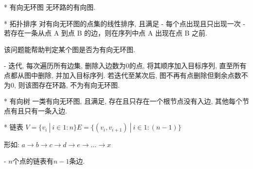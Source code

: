 * 有向无环图
	\Define
		无环路的有向图.

	\Property
		* 拓扑排序
			\Problem
				对有向无环图的点集的线性排序, 且满足
				- 每个点出现且只出现一次
				- 若存在一条从点 A 到点 B 的边，则在序列中点 A 出现在点 B 之前.

				\Note
					该问题能帮助判定某个图是否为有向无环图.

			\Algorithm
				- 迭代, 每次遍历所有边集, 删除入边数为0的点, 将其顺序加入目标序列, 直至所有点都从图中删除, 并加入目标序列. 若迭代至某次后, 图不再有点删除但剩余点数不为0, 则该图存在环路, 不为有向无环图.

	\Include
		* 有向树
			\Define
				一类有向无环图, 且满足, 存在且只存在一个根节点没有入边, 其他每个节点有且只有一条入边.

			\Include
				* 链表
					\Define
						$
							V = \{v_i \ |\ i \in 1:n\}
							E = \{(v_i, v_{i+1}) \ |\ i \in 1:(n-1)\}  \tag{序号相邻两点连一条边}
						$

						形如: 
							$a \to b \to c \to d \to e \to ... \to x$

					\Property
						- $n$个点的链表有$n-1$条边.
